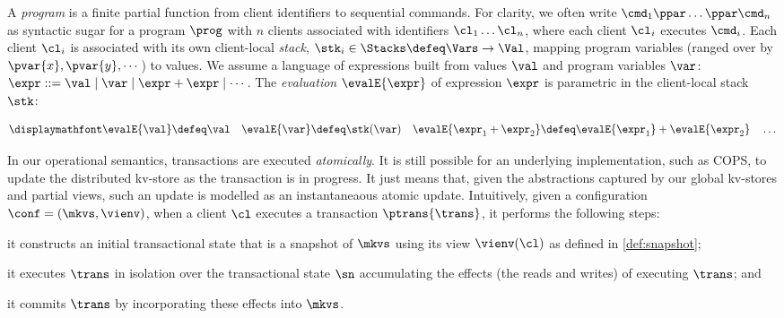 A {\em program} is a finite partial function from client identifiers to sequential
commands.
For clarity, we often write \( \cmd_{1}\ppar \dots \ppar \cmd_{n}\) as syntactic sugar 
for a program \( \prog \) with $n$ clients associated with identifiers
$\cl_1 \dots \cl_n$, where each client $\cl_i$ executes
$\cmd_i$. 
Each client $\cl_i$ is associated with its own client-local  \emph{stack}, 
$\stk_i \in \Stacks \defeq \Vars \to \Val$,  mapping program variables
(ranged over by $\pvar{x}, \pvar{y}, \cdots$)
to values. 
We assume a language of expressions built from values \( \val \)
and program variables \( \var \):
$\expr ::= \val \mid \var \mid \expr + \expr \mid \cdots$.
The \emph{evaluation} $\evalE{\expr}$ of expression $\expr$ is parametric in
the client-local stack \( \stk \):%

\vspace{-5pt}
{%
\[
\displaymathfont
\begin{gathered}
\evalE{\val} \defeq
\val
\quad
\evalE{\var} \defeq
\stk(\var)
\quad
\evalE{\expr_{1} + \expr_{2}} \defeq
\evalE{\expr_{1}} + \evalE{\expr_{2}}
\quad
\dots
\end{gathered}%
\]
}%

   In our operational semantics, transactions are executed
\emph{atomically}. It is still possible for an underlying
implementation, such as COPS, to update the distributed kv-store as
the transaction is in progress. It just means that, given the
abstractions captured by our global kv-stores and partial views, 
such an update is modelled as  an instantaneaous  atomic
update.
Intuitively, given a configuration $\conf = (\mkvs, \vienv)$, 
when a client $\cl$ executes a transaction $\ptrans{\trans}$, 
it performs the following steps: 
\begin{enumerate*}
	\item it constructs an initial transactional state that is a snapshot of $\mkvs$ using its view $\vienv(\cl)$ as defined in \cref{def:snapshot};  
	\item it executes $\trans$ in isolation over the transactional state $\sn$
        accumulating the effects (the reads and writes) of executing $\trans$; and
	\item it commits $\trans$ by incorporating these effects into $\mkvs$.
\end{enumerate*}

